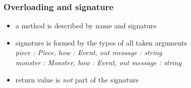 \documentclass{slides}
\begin{document}
\begin{frame}
  \frametitle{Overloading and signature}
  
  \begin{center}
  \end{center}

  \begin{itemize}
  \item a method is described by name and \alert{signature}
  \item signature is formed by the types of all taken arguments\\
    \emph{piece : Piece, how : Event, out message : string}\\
    \emph{monster : Monster, how : Event, out message : string}
  \item return value is \emph{not} part of the signature
  \end{itemize}
\end{frame}
\end{document}
